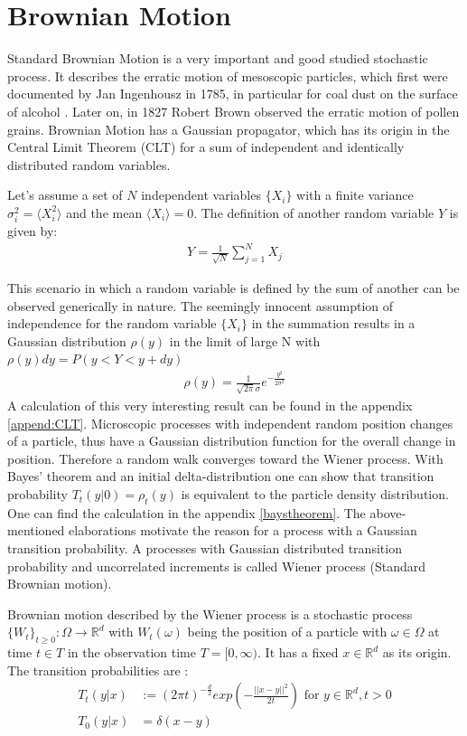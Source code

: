 \documentclass[
  a4paper,BCOR10mm,oneside,
  bibtotoc,idxtotoc,
  headsepline,footsepline,%
  fleqn,openbib
]{scrbook}
\begin{document}
\section{Brownian Motion}
Standard Brownian Motion is a very important and good studied stochastic process. It describes the erratic motion of mesoscopic particles, which first were documented by Jan Ingenhousz in 1785, in particular for coal dust on the surface of alcohol \cite{Hofling2013}. Later on, in 1827 Robert Brown observed the erratic motion of pollen grains. Brownian Motion has a Gaussian propagator, which has its origin in the Central Limit Theorem (CLT) for a sum of independent and identically distributed random variables.
\begin{mydef} 
Let's assume a set of $N$ independent variables $\{X_i\}$ with a finite variance $ \sigma_i^2=\langle X_{i}^2\rangle $ and the mean $\langle X_{i}\rangle = 0$. The definition of another random variable $Y$ is given by:
 \begin{align}
  Y = \frac{1}{\sqrt{N}} \sum_{j=1}^N X_j \label{eq:CLT}
 \end{align}
\end{mydef}
This scenario in which a random variable is defined by the sum of another can be observed generically in nature. The seemingly innocent assumption of independence for the random variable $\{X_i\}$ in the summation results in a Gaussian distribution $\rho(y)$ in the limit of large N with $\rho(y)dy=P(y<Y<y+dy)$ 
\begin{align}
 \rho(y) =\frac{1}{\sqrt{2 \pi} \sigma } e^{-\frac{y^2}{2 \sigma^2}}
\end{align}
A calculation of this very interesting result can be found in the appendix \ref{append:CLT}.    Microscopic processes with independent random position changes of a particle, thus have a Gaussian distribution function for the overall change in position. Therefore a random walk converges toward the Wiener process. \newline With  Bayes' theorem and an initial delta-distribution one can show that transition probability $T_{t}(y|0) = \rho_{t}(y)$ is equivalent to the particle density distribution. One can find the calculation in the appendix \cref{baystheorem}. The above-mentioned elaborations motivate the reason for a process with a Gaussian transition probability. A processes with Gaussian distributed transition probability and uncorrelated increments is called Wiener process (Standard Brownian motion).
\begin{mydef}
Brownian motion described by the Wiener process is a stochastic process $ \{ W_t \}_{t\geq0}: \Omega \rightarrow \mathbb{R}^d$ with $ W_t(\omega)$ being the position of a particle with $\omega \in \Omega$ at time $t \in T$ in the observation time $T =[0, \infty)$. It has a fixed $x \in \mathbb{R}^d$ as its origin. The transition probabilities are \cite{LectureFelix}: 
\begin{align}
T_{t}(y|x) & := (2 \pi t)^{- \frac{d}{2}} exp \left(- \frac{||x-y||^2}{2 t}\right) \text{ for } y \in \mathbb{R}^d, t>0 \\ \nonumber
T_{0}(y|x) & = \delta(x-y) 
\end{align}
\end{mydef}
\end{document}

